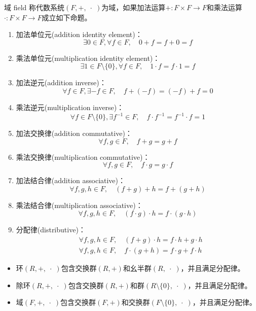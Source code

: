 \begin{definition}{域 field}
	称代数系统$(F,+,\;\cdot\;)$为域，如果加法运算$+:F\times F\to F$和乘法运算$\cdot :F\times F\to F$成立如下命题。
	\begin{enumerate}
		\item 加法单位元(addition identity element)：
		$$
		\exists 0\in F,\forall f\in F,\quad 0+f=f+0=f
		$$
		\item 乘法单位元(multiplication identity element)：
		$$
		\exists 1\in F\setminus\{0\},\forall f\in F,\quad 1\cdot f=f\cdot 1=f
		$$
		\item 加法逆元(addition inverse)：
		$$
		\forall f\in F,\exists-f\in F,\quad f+(-f)=(-f)+f=0
		$$
		\item 乘法逆元(multiplication inverse)：
		$$
		\forall f\in F\setminus\{0\},\exists f^{-1}\in F,\quad f\cdot f^{-1}=f^{-1}\cdot f=1
		$$
		\item 加法交换律(addition commutative)：
		$$
		\forall f,g\in F,\quad f+g=g+f
		$$
		\item 乘法交换律(multiplication commutative)：
		$$
		\forall f,g\in F,\quad f\cdot g=g\cdot f
		$$
		\item 加法结合律(addition associative)：
		$$
		\forall f,g,h\in F,\quad (f+g)+h=f+(g+h)
		$$
		\item 乘法结合律(multiplication associative)：
		$$
		\forall f,g,h\in F,\quad (f\cdot g)\cdot h=f\cdot (g\cdot h)
		$$
		\item 分配律(distributive)：
		\begin{align*}
			&\forall f,g,h\in F,\quad (f+g)\cdot h=f\cdot h+g\cdot h\\
			&\forall f,g,h\in F,\quad f\cdot(g+h)=f\cdot g+f\cdot h
		\end{align*}
	\end{enumerate}
\end{definition}

\begin{note}
	\begin{itemize}
		\item 环$(R,+,\;\cdot\;)$包含交换群$(R,+)$和幺半群$(R,\;\cdot\;)$，并且满足分配律。
		\item 除环$(R,+,\;\cdot\;)$包含交换群$(R,+)$和群$(R\setminus\{0\},\;\cdot\;)$，并且满足分配律。
		\item 域$(F,+,\;\cdot\;)$包含交换群$(F,+)$和交换群$(F\setminus\{0\},\;\cdot\;)$，并且满足分配律。
	\end{itemize}
\end{note}

